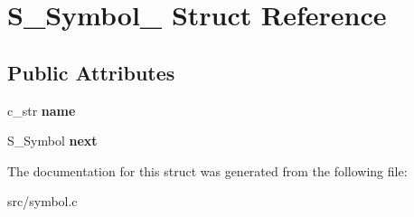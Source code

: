 \hypertarget{structS__Symbol__}{}\section{S\+\_\+\+Symbol\+\_\+ Struct Reference}
\label{structS__Symbol__}
\subsection*{Public Attributes}
\begin{DoxyCompactItemize}
\item 
\hypertarget{structS__Symbol___aac12a0d7a3696f97a7cd48eb27299cb4}{}\label{structS__Symbol___aac12a0d7a3696f97a7cd48eb27299cb4} 
c\+\_\+str {\bfseries name}
\item 
\hypertarget{structS__Symbol___a021026e5703c424e534873dd87146ab5}{}\label{structS__Symbol___a021026e5703c424e534873dd87146ab5} 
S\+\_\+\+Symbol {\bfseries next}
\end{DoxyCompactItemize}


The documentation for this struct was generated from the following file\+:\begin{DoxyCompactItemize}
\item 
src/symbol.\+c\end{DoxyCompactItemize}
